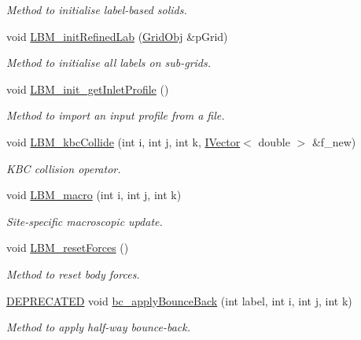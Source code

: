 \begin{DoxyCompactItemize}
\begin{DoxyCompactList}\small\item\em Method to initialise label-\/based solids. \end{DoxyCompactList}\item 
void \hyperlink{class_grid_obj_a3ba133d06625fb576ca0909b946033b2}{L\+B\+M\+\_\+init\+Refined\+Lab} (\hyperlink{class_grid_obj}{Grid\+Obj} \&p\+Grid)
\begin{DoxyCompactList}\small\item\em Method to initialise all labels on sub-\/grids. \end{DoxyCompactList}\item 
void \hyperlink{class_grid_obj_a023713976673d029103690a91c5415f9}{L\+B\+M\+\_\+init\+\_\+get\+Inlet\+Profile} ()
\begin{DoxyCompactList}\small\item\em Method to import an input profile from a file. \end{DoxyCompactList}\item 
void \hyperlink{class_grid_obj_ac4ca0327a53171fe8e1c3076e9f1353f}{L\+B\+M\+\_\+kbc\+Collide} (int i, int j, int k, \hyperlink{class_i_vector}{I\+Vector}$<$ double $>$ \&f\+\_\+new)
\begin{DoxyCompactList}\small\item\em K\+BC collision operator. \end{DoxyCompactList}\item 
void \hyperlink{class_grid_obj_ab69942450175d12c75f4b8d33b06c905}{L\+B\+M\+\_\+macro} (int i, int j, int k)
\begin{DoxyCompactList}\small\item\em Site-\/specific macroscopic update. \end{DoxyCompactList}\item 
void \hyperlink{class_grid_obj_a5701631be6333e512c7fc8dd6ecabf85}{L\+B\+M\+\_\+reset\+Forces} ()
\begin{DoxyCompactList}\small\item\em Method to reset body forces. \end{DoxyCompactList}\item 
\hyperlink{stdafx_8h_ac1e8a42306d8e67cb94ca31c3956ee78}{D\+E\+P\+R\+E\+C\+A\+T\+ED} void \hyperlink{class_grid_obj_a2dc94b1d2e3f14a1a086b8bfa078839b}{bc\+\_\+apply\+Bounce\+Back} (int label, int i, int j, int k)
\begin{DoxyCompactList}\small\item\em Method to apply half-\/way bounce-\/back. \end{DoxyCompactList}\item 

\end{DoxyCompactItemize}
